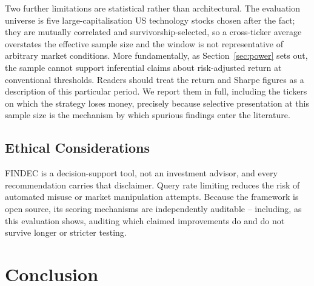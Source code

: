 \documentclass[conference]{IEEEtran}
\begin{document}
Two further limitations are statistical rather than architectural. The evaluation universe is five large-capitalisation US technology stocks chosen after the fact; they are mutually correlated and survivorship-selected, so a cross-ticker average overstates the effective sample size and the window is not representative of arbitrary market conditions. More fundamentally, as Section~\ref{sec:power} sets out, the sample cannot support inferential claims about risk-adjusted return at conventional thresholds. Readers should treat the return and Sharpe figures as a description of this particular period. We report them in full, including the tickers on which the strategy loses money, precisely because selective presentation at this sample size is the mechanism by which spurious findings enter the literature.

\subsection{Ethical Considerations}

FINDEC is a decision-support tool, not an investment advisor, and every recommendation carries that disclaimer. Query rate limiting reduces the risk of automated misuse or market manipulation attempts. Because the framework is open source, its scoring mechanisms are independently auditable -- including, as this evaluation shows, auditing which claimed improvements do and do not survive longer or stricter testing.

\section{Conclusion}
\label{sec:conclusion}
\end{document}
